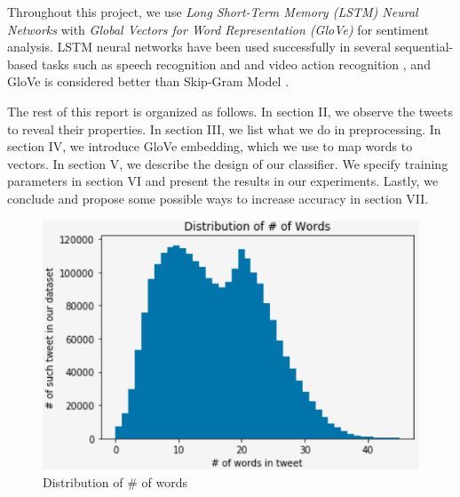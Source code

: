 \documentclass[10pt,conference,compsocconf]{IEEEtran}
\begin{document}
Throughout this project, we use \textit{Long Short-Term Memory (LSTM) Neural Networks} with \textit{Global Vectors for Word Representation (GloVe)} for sentiment analysis. LSTM neural networks have been used successfully in several sequential-based tasks such as speech recognition \cite{speech_recog} and and video action recognition \cite{video_action}, and GloVe is considered better than Skip-Gram Model \cite{skip-gram}.

The rest of this report is organized as follows. In section II, we observe the tweets to reveal their properties. In section III, we list what we do in preprocessing. In section IV, we introduce GloVe embedding, which we use to map words to vectors. In section V, we describe the design of our classifier. We specify training parameters in section VI and present the results in our experiments. Lastly, we conclude and propose some possible ways to increase accuracy in section VII.


\begin{figure}[t]
\begin{center}
  \includegraphics[width=\columnwidth]{num_words_distribution.PNG}
  \caption{Distribution of \# of words}
  \label{fig:num_words_distribution}
\end{center}
\end{figure}
\end{document}
